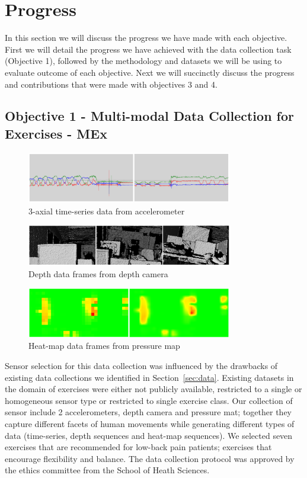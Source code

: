 \documentclass[runningheads]{llncs}
\begin{document}
\section{Progress}
In this section we will discuss the progress we have made with each objective. First we will detail the progress we have achieved with the data collection task (Objective 1), followed by the methodology and datasets we will be using to evaluate outcome of each objective. Next we will succinctly discuss the progress and contributions that were made with objectives 3 and 4. 
\label{sec:pro}
\subsection{Objective 1 - Multi-modal Data Collection for Exercises - MEx}

\begin{figure}[ht]
\centering
\includegraphics[width=0.8\textwidth]{acc.png}
\caption{3-axial time-series data from accelerometer}
\label {fig:acce}
\end{figure}

\begin{figure}[ht]
\centering
\includegraphics[width=0.8\textwidth]{dpt.png}
\caption{Depth data frames from depth camera}
\label {fig:rgbd}
\end{figure}

\begin{figure}[ht]
\centering
\includegraphics[width=0.8\textwidth]{pm.png}
\caption{Heat-map data frames from pressure map }
\label{fig:pressure}
\end{figure}

Sensor selection for this data collection was influenced by the drawbacks of existing data collections we identified in Section~\ref{sec:data}. Existing datasets in the domain of exercises were either not publicly available, restricted to a single or homogeneous sensor type or restricted to single exercise class. 
Our collection of sensor include 2 accelerometers, depth camera and pressure mat; together they capture different facets of human movements while generating different types of data (time-series, depth sequences and heat-map sequences). We selected seven exercises that are recommended for low-back pain patients; exercises that encourage flexibility and balance. The data collection protocol was approved by the ethics committee from the School of Heath Sciences. 
\end{document}
